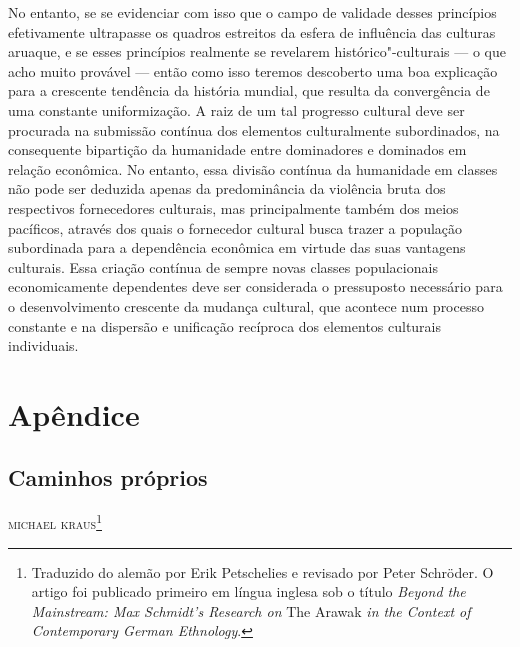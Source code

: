 No entanto, se se evidenciar com isso que o campo de validade desses
princípios efetivamente ultrapasse os quadros estreitos da esfera de
influência das culturas aruaque, e se esses princípios realmente se
revelarem histórico"-culturais --- o que acho muito provável --- então como
isso teremos descoberto uma boa explicação para a crescente tendência da
história mundial, que resulta da convergência de uma constante
uniformização. A raiz de um tal progresso cultural deve ser procurada na
submissão contínua dos elementos culturalmente subordinados, na
consequente bipartição da humanidade entre dominadores e dominados em
relação econômica. No entanto, essa divisão contínua da humanidade em
classes não pode ser deduzida apenas da predominância da violência bruta
dos respectivos fornecedores culturais, mas principalmente também dos
meios pacíficos, através dos quais o fornecedor cultural busca trazer a
população subordinada para a dependência econômica em virtude das suas
vantagens culturais. Essa criação contínua de sempre novas classes
populacionais economicamente dependentes deve ser considerada o
pressuposto necessário para o desenvolvimento crescente da mudança
cultural, que acontece num processo constante e na dispersão e
unificação recíproca dos elementos culturais individuais.

\part{Apêndice}

\chapter*{Caminhos próprios\smallskip{}}


\begin{flushright}
\textsc{michael kraus}\footnote{Traduzido do  alemão por Erik Petschelies e revisado por Peter Schröder. O artigo foi publicado primeiro em língua inglesa sob o título \textit{Beyond the Mainstream: Max Schmidt's Research on} The Arawak \textit{in the Context of Contemporary German Ethnology}.} 
\end{flushright}

